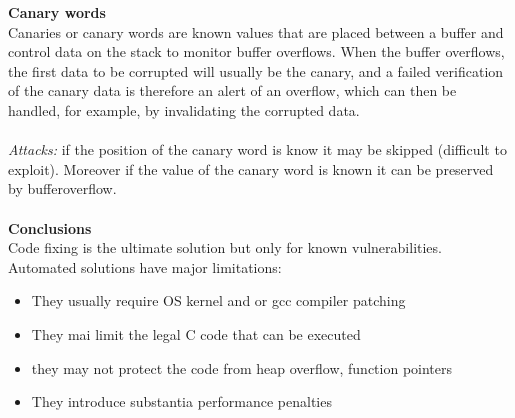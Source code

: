 \documentclass[10pt,a4paper]{article}
\begin{document}
\textbf{Canary words}\\
Canaries or canary words are known values that are placed between a buffer and control data on the stack to monitor buffer overflows. When the buffer overflows, the first data to be corrupted will usually be the canary, and a failed verification of the canary data is therefore an alert of an overflow, which can then be handled, for example, by invalidating the corrupted data.\\\\
\emph{Attacks:} if the position of the canary word is know it may be skipped (difficult to exploit). Moreover if the value of the canary word is known it can be preserved by bufferoverflow.\\\\
\textbf{Conclusions}\\
Code fixing is the ultimate solution but only for known vulnerabilities. Automated solutions have major limitations:
\begin{itemize}
\item They usually require OS kernel and or gcc compiler patching
\item They mai limit the legal C code that can be executed
\item they may not protect the code from heap overflow, function pointers
\item They introduce substantia performance penalties
\end{itemize}
\newpage
\end{document}
